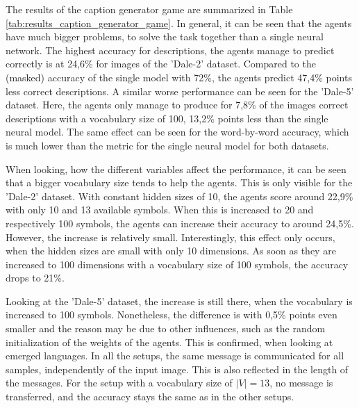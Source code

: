 The results of the caption generator game are summarized in Table \ref{tab:results_caption_generator_game}.
In general, it can be seen that the agents have much bigger problems, to solve the task together than a single neural network.
The highest accuracy for descriptions, the agents manage to predict correctly is at 24,6\% for images of the 'Dale-2' dataset.
Compared to the (masked) accuracy of the single model with 72\%, the agents predict 47,4\% points less correct descriptions.
A similar worse performance can be seen for the 'Dale-5' dataset.
Here, the agents only manage to produce for 7,8\% of the images correct descriptions with a vocabulary size of 100, 13,2\% points less than the single neural model.
The same effect can be seen for the word-by-word accuracy, which is much lower than the metric for the single neural model for both datasets.

When looking, how the different variables affect the performance, it can be seen that a bigger vocabulary size tends to help the agents.
This is only visible for the 'Dale-2' dataset.
With constant hidden sizes of 10, the agents score around 22,9\% with only 10 and 13 available symbols.
When this is increased to 20 and respectively 100 symbols, the agents can increase their accuracy to around 24,5\%.
However, the increase is relatively small.
Interestingly, this effect only occurs, when the hidden sizes are small with only 10 dimensions.
As soon as they are increased to 100 dimensions with a vocabulary size of 100 symbols, the accuracy drops to 21\%.

Looking at the 'Dale-5' dataset, the increase is still there, when the vocabulary is increased to 100 symbols.
Nonetheless, the difference is with 0,5\% points even smaller and the reason may be due to other influences, such as the random initialization of the weights of the agents.
This is confirmed, when looking at emerged languages.
In all the setups, the same message is communicated for all samples, independently of the input image.
This is also reflected in the length of the messages.
For the setup with a vocabulary size of $|V| = 13$, no message is transferred, and the accuracy stays the same as in the other setups.

